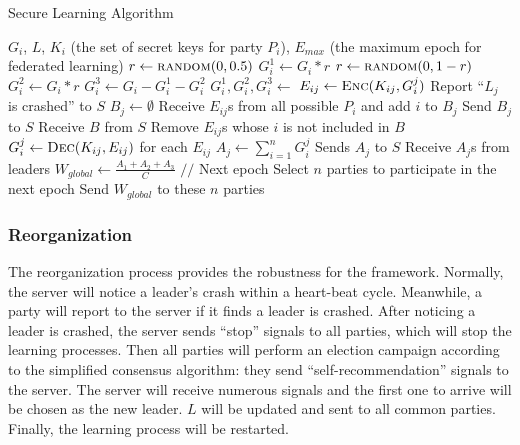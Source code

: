\begin{algorithm}
    \label{sec-learning}
    \caption{Secure Learning Algorithm}
    \begin{algorithmic}[1] 
        \Require $G_i$, $L$, $K_i$ (the set of secret keys for party $P_i$), $E_{max}$ (the maximum epoch for federated learning)
            \State $r \gets \Call{random}{0, 0.5}$
            \State $G_i^1 \gets G_i * r$
            \State $r \gets \Call{random}{0, 1-r}$
            \State $G_i^2 \gets G_i * r$
            \State $G_i^3 \gets G_i - G_i^1 - G_i^2$
            \State {}
        \EndFunction
        \State
            \State $G_i^1, G_i^2, G_i^3 \gets$ 
                \State $E_{ij} \gets \Call{Enc}{K_{ij}, G_i^j}$
                    \State Report ``$L_j$ is crashed'' to $S$
                \EndIf
            \EndFor
        \EndFunction
        \State
            \State $B_j \gets \emptyset$
            \State Receive $E_{ij}$s from all possible $P_i$ and add $i$ to $B_j$
            \State Send $B_j$ to $S$
            \State Receive $B$ from $S$
            \State Remove $E_{ij}$s whose $i$ is not included in $B$
            \State $G_i^j \gets \Call{Dec}{K_{ij}, E_{ij}}$ for each $E_{ij}$
            \State $A_j \gets \sum_{i=1}^nG_i^j$
            \State Sends $A_j$ to $S$
        \EndFunction
        \State
                \State {}
            \EndIf
            \State Receive $A_j$s from leaders
            \State $W_{global} \gets \frac{A_1 + A_2 + A_3}{C} $
            \State {} 
            \State $//$ Next epoch
            \State Select $n$ parties to participate in the next epoch
            \State Send $W_{global}$ to these $n$ parties
            \State {}
        \EndFunction
    \end{algorithmic}
\end{algorithm}


\subsubsection{\textbf{Reorganization}}
The reorganization process provides the robustness for the framework. Normally, the server will notice a leader's crash within a heart-beat cycle. Meanwhile, a party will report to the server if it finds a leader is crashed. After noticing a leader is crashed, the server sends ``stop'' signals to all parties, which will stop the learning processes. Then all parties will perform an election campaign according to the simplified consensus algorithm: they send ``self-recommendation'' signals to the server. The server will receive numerous signals and the first one to arrive will be chosen as the new leader. $L$ will be updated and sent to all common parties. Finally, the learning process will be restarted.

